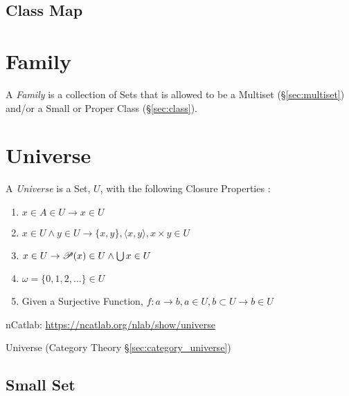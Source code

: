\subsection{Class Map}\label{sec:class_map}



\section{Family}\label{sec:family}

A \emph{Family} is a collection of Sets that is allowed to be a
Multiset (\S\ref{sec:multiset}) and/or a Small or Proper Class
(\S\ref{sec:class}).



\section{Universe}\label{sec:set_universe}

A \emph{Universe} is a Set, $U$, with the following Closure Properties
\cite{maclane69}:
\begin{enumerate}
\item $x \in A \in U \rightarrow x \in U$
\item $x \in U \wedge y \in U \rightarrow \{x,y\}, \langle x,y
  \rangle, x \times y \in U$
\item $x \in U \rightarrow \mathscr{P}(x) \in U \wedge \bigcup x \in U$
\item $\omega = \{0,1,2,\ldots\} \in U$
\item Given a Surjective Function, $f : a \rightarrow b, a \in
  U, b \subset U \rightarrow b \in U$
\end{enumerate}

nCatlab: \url{https://ncatlab.org/nlab/show/universe}

\fist Universe (Category Theory \S\ref{sec:category_universe})




\subsection{Small Set}\label{sec:small_set}

